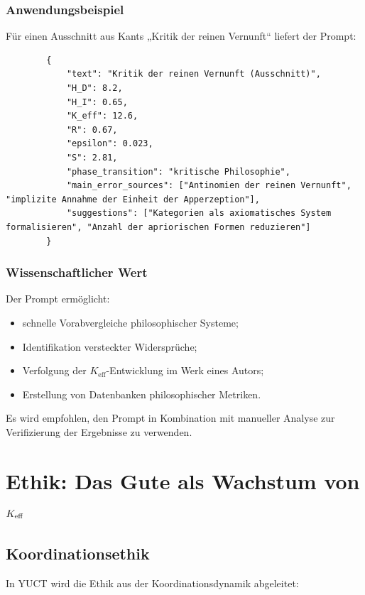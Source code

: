 \documentclass[12pt,a4paper]{article}
\begin{document}
	\subsubsection{Anwendungsbeispiel}
	
	Für einen Ausschnitt aus Kants „Kritik der reinen Vernunft“ liefert der Prompt:
	
	\begin{verbatim}
		{
			"text": "Kritik der reinen Vernunft (Ausschnitt)",
			"H_D": 8.2,
			"H_I": 0.65,
			"K_eff": 12.6,
			"R": 0.67,
			"epsilon": 0.023,
			"S": 2.81,
			"phase_transition": "kritische Philosophie",
			"main_error_sources": ["Antinomien der reinen Vernunft", "implizite Annahme der Einheit der Apperzeption"],
			"suggestions": ["Kategorien als axiomatisches System formalisieren", "Anzahl der apriorischen Formen reduzieren"]
		}
	\end{verbatim}
	
	\subsubsection{Wissenschaftlicher Wert}
	
	Der Prompt ermöglicht:
	\begin{itemize}
		\item schnelle Vorabvergleiche philosophischer Systeme;
		\item Identifikation versteckter Widersprüche;
		\item Verfolgung der \(K_{\mathrm{eff}}\)-Entwicklung im Werk eines Autors;
		\item Erstellung von Datenbanken philosophischer Metriken.
	\end{itemize}
	
	Es wird empfohlen, den Prompt in Kombination mit manueller Analyse zur Verifizierung der Ergebnisse zu verwenden.
	
	\section{Ethik: Das Gute als Wachstum von \texorpdfstring{\(\Keff\)}{K\_eff}}
	
	\subsection{Koordinationsethik}
	
	In YUCT wird die Ethik aus der Koordinationsdynamik abgeleitet:
	
\end{document}
